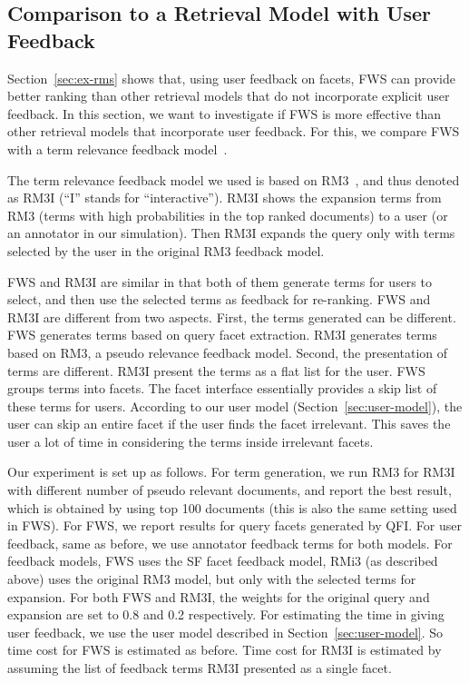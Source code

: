 \subsection{Comparison to a Retrieval Model with User Feedback}
Section~\ref{sec:ex-rms} shows that, using user feedback on facets, FWS can provide better ranking than other retrieval models that do not incorporate explicit user feedback. In this section, we want to investigate if FWS is more effective than other retrieval models that incorporate user feedback. For this, we compare FWS with a term relevance feedback model~\cite{koenemann1996case,tan2007term}.

The term relevance feedback model we used is based on RM3~\cite{abdul2004umass,lavrenko2001relevance}, and thus denoted as RM3I (``I'' stands for ``interactive''). RM3I shows the expansion terms from RM3 (terms with high probabilities in the top ranked documents) to a user (or an annotator in our simulation). Then RM3I expands the query only with terms selected by the user in the original RM3 feedback model.

FWS and RM3I are similar in that both of them generate terms for users to select, and then use the selected terms as feedback for re-ranking.  
FWS and RM3I are different from two aspects. First, the terms generated can be different. FWS generates terms based on query facet extraction. RM3I generates terms based on RM3, a pseudo relevance feedback model. Second, the presentation of terms are different. RM3I present the terms as a flat list for the user. FWS groups terms into facets. The facet interface essentially provides a skip list of these terms for users. According to our user model (Section~\ref{sec:user-model}), the user can skip an entire facet if the user finds the facet irrelevant. This saves the user a lot of time in considering the terms inside irrelevant facets.

Our experiment is set up as follows. For term generation, we run RM3 for RM3I with different number of pseudo relevant documents, and report the best result, which is obtained by using top 100 documents (this is also the same setting used in FWS). For FWS, we report results for query facets generated by QFI. For user feedback, same as before, we use annotator feedback terms for both models. For feedback models, FWS uses the SF facet feedback model, RMi3 (as described above) uses the original RM3 model, but only with the selected terms for expansion. For both FWS and RM3I, the weights for the original query and expansion are set to 0.8 and 0.2 respectively. For estimating the time in giving user feedback, we use the user model described in Section~\ref{sec:user-model}. So time cost for FWS is estimated as before. Time cost for RM3I is estimated by assuming the list of feedback terms RM3I presented as a single facet.


